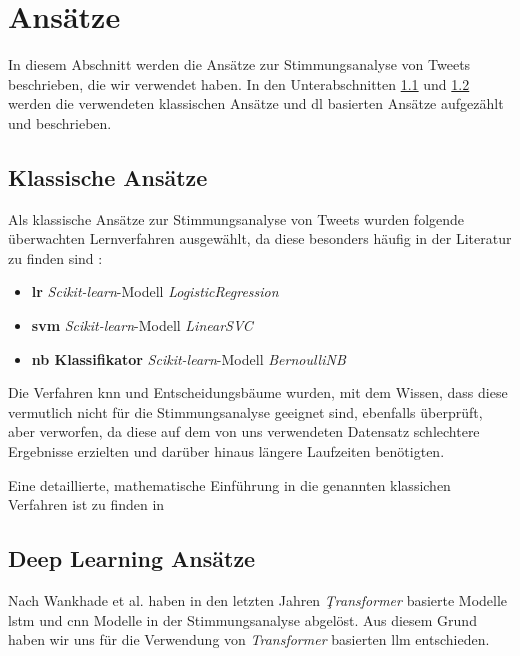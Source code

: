 \section{Ansätze}

In diesem Abschnitt werden die Ansätze zur Stimmungsanalyse von Tweets beschrieben, die wir verwendet haben.
In den Unterabschnitten \ref{subsec:klassische-ansaetze} und \ref{subsec:deep-learning-ansaetze} werden die verwendeten klassischen Ansätze und \gls{dl} basierten Ansätze aufgezählt und beschrieben.

\subsection{Klassische Ansätze}\label{subsec:klassische-ansaetze}

Als klassische Ansätze zur Stimmungsanalyse von Tweets wurden folgende überwachten Lernverfahren ausgewählt, da diese besonders häufig in der Literatur zu finden sind \cite{medhat2014sentiment, wankhade2022survey, zimbra2018state}:

\begin{itemize}
    \item \textbf{\gls{lr}} \textit{Scikit-learn}-Modell \textit{LogisticRegression}
    \item \textbf{\gls{svm}} \textit{Scikit-learn}-Modell \textit{LinearSVC}
    \item \textbf{\gls{nb} Klassifikator} \textit{Scikit-learn}-Modell \textit{BernoulliNB}
\end{itemize}

Die Verfahren \gls{knn} und Entscheidungsbäume wurden, mit dem Wissen, dass diese vermutlich nicht für die Stimmungsanalyse geeignet sind, ebenfalls überprüft, aber verworfen, da diese auf dem von uns verwendeten Datensatz schlechtere Ergebnisse erzielten und darüber hinaus längere Laufzeiten benötigten.

Eine detaillierte, mathematische Einführung in die genannten klassichen Verfahren ist zu finden in \cite[vgl. die Kapitel 4.4 für \gls{lr}, 4.5 und 12 für \gls{svm}, 6.6.3 für den \gls{nb} Klassifikator, 13.3 für \gls{knn} und 9.2 für Entscheidungsbäume]{hastie2009elements}

\subsection{Deep Learning Ansätze}\label{subsec:deep-learning-ansaetze}

Nach Wankhade et al. \cite{wankhade2022survey} haben in den letzten Jahren \textit{Ţransformer} basierte Modelle \gls{lstm} und \gls{cnn} Modelle in der Stimmungsanalyse abgelöst.
Aus diesem Grund haben wir uns für die Verwendung von \textit{Transformer} basierten \gls{llm} entschieden.


